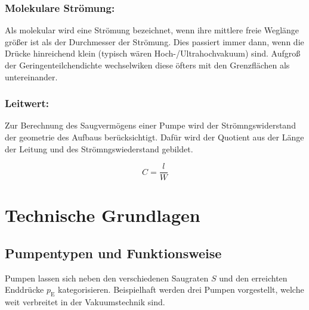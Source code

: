 \subsubsection{Molekulare Strömung:}
Als molekular wird eine Strömung bezeichnet, wenn ihre mittlere freie Weglänge größer ist als der Durchmesser der Strömung. Dies passiert immer dann, wenn die Drücke hinreichend klein (typisch wären Hoch-/Ultrahochvakuum) sind. Aufgroß der Geringenteilchendichte wechselwiken diese öfters mit den Grenzflächen als untereinander.

\subsubsection{Leitwert:}
Zur Berechnung des Saugvermögens einer Pumpe wird der Strömngswiderstand der geometrie des Aufbaus berücksichtigt. Dafür wird der Quotient aus der Länge der Leitung und des Strömngswiederstand gebildet.

\begin{equation}
  C = \frac{l}{W}
\end{equation}


\section{Technische Grundlagen}

\subsection{Pumpentypen und Funktionsweise}
Pumpen lassen sich neben den verschiedenen Saugraten $S$ und den erreichten Enddrücke $p_\text{E}$ kategorisieren. Beispielhaft werden drei Pumpen vorgestellt, welche weit verbreitet in der Vakuumstechnik sind. 

